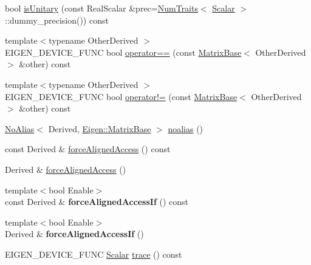 \begin{DoxyCompactItemize}
\item 
bool \mbox{\hyperlink{class_eigen_1_1_matrix_base_a8a7ee34ce202cac3eeea9cf20c9e4833}{is\+Unitary}} (const Real\+Scalar \&prec=\mbox{\hyperlink{struct_eigen_1_1_num_traits}{Num\+Traits}}$<$ \mbox{\hyperlink{class_eigen_1_1_dense_base_a5feed465b3a8e60c47e73ecce83e39a2}{Scalar}} $>$\+::dummy\+\_\+precision()) const
\item 
{\footnotesize template$<$typename Other\+Derived $>$ }\\E\+I\+G\+E\+N\+\_\+\+D\+E\+V\+I\+C\+E\+\_\+\+F\+U\+NC bool \mbox{\hyperlink{class_eigen_1_1_matrix_base_a0f555511cb0f8ccbbb0e6c597c4cf412}{operator==}} (const \mbox{\hyperlink{class_eigen_1_1_matrix_base}{Matrix\+Base}}$<$ Other\+Derived $>$ \&other) const
\item 
{\footnotesize template$<$typename Other\+Derived $>$ }\\E\+I\+G\+E\+N\+\_\+\+D\+E\+V\+I\+C\+E\+\_\+\+F\+U\+NC bool \mbox{\hyperlink{class_eigen_1_1_matrix_base_a932a37b58d2bad69849a3a8809aaffac}{operator!=}} (const \mbox{\hyperlink{class_eigen_1_1_matrix_base}{Matrix\+Base}}$<$ Other\+Derived $>$ \&other) const
\item 
\mbox{\hyperlink{class_eigen_1_1_no_alias}{No\+Alias}}$<$ Derived, \mbox{\hyperlink{class_eigen_1_1_matrix_base}{Eigen\+::\+Matrix\+Base}} $>$ \mbox{\hyperlink{class_eigen_1_1_matrix_base_a2c1085de7645f23f240876388457da0b}{noalias}} ()
\item 
const Derived \& \mbox{\hyperlink{class_eigen_1_1_matrix_base_ad2fdb842d9a715f8778d0b33c29cfe49}{force\+Aligned\+Access}} () const
\item 
Derived \& \mbox{\hyperlink{class_eigen_1_1_matrix_base_afdaf810ac1708ca6d6ecdcfac1e06699}{force\+Aligned\+Access}} ()
\item 
\mbox{\label{class_eigen_1_1_matrix_base_a79989e25bd6d08c766a23e50df2e3fef}} 
{\footnotesize template$<$bool Enable$>$ }\\const Derived \& {\bfseries force\+Aligned\+Access\+If} () const
\item 
\mbox{\label{class_eigen_1_1_matrix_base_a86b611320f6f7c5d31e3806f156681e3}} 
{\footnotesize template$<$bool Enable$>$ }\\Derived \& {\bfseries force\+Aligned\+Access\+If} ()
\item 
E\+I\+G\+E\+N\+\_\+\+D\+E\+V\+I\+C\+E\+\_\+\+F\+U\+NC \mbox{\hyperlink{class_eigen_1_1_dense_base_a5feed465b3a8e60c47e73ecce83e39a2}{Scalar}} \mbox{\hyperlink{class_eigen_1_1_matrix_base_a2cc7a95b161f3a660bdb8ff048b44161}{trace}} () const

\end{DoxyCompactItemize}
